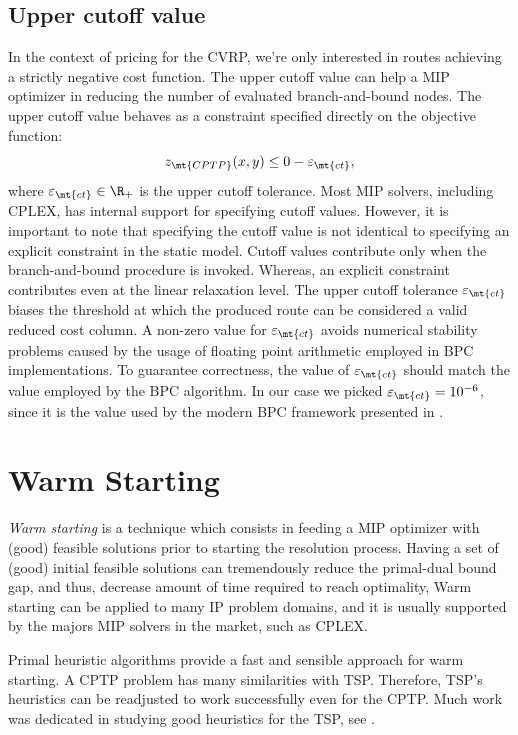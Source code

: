 \subsection{Upper cutoff value}
\label{sec:impl-upper-cutoff-value}

In the context of pricing for the CVRP,
we're only interested in routes achieving a strictly negative cost function.
The upper cutoff value can help a MIP optimizer
in reducing the number of evaluated branch-and-bound nodes.
The upper cutoff value behaves as a constraint specified directly on the objective function:
\begin{equation}
	z_\mt{CPTP}(x, y) \le 0 - \varepsilon_{\mt{ct}},
\end{equation}
where $\varepsilon_{\mt{ct}} \in \R_+$ is the upper cutoff tolerance.
Most MIP solvers, including CPLEX, has internal support for specifying cutoff values.
However, it is important to note that specifying the cutoff value is not identical
to specifying an explicit constraint in the static model.
Cutoff values contribute only when the branch-and-bound procedure is invoked.
Whereas, an explicit constraint contributes even at the linear relaxation level.
The upper cutoff tolerance $\varepsilon_{\mt{ct}}$ biases the threshold at which the produced
route can be considered a valid reduced cost column.
A non-zero value for $\varepsilon_{\mt{ct}}$ avoids numerical
stability problems caused by the usage of floating point arithmetic
employed in BPC implementations.
To guarantee correctness, the value of $\varepsilon_{\mt{ct}}$ should match the
value employed by the BPC algorithm.
In our case we picked $\varepsilon_{\mt{ct}} = 10^{-6}$,
since it is the value used by the modern BPC framework presented in \textcite{sadykov2021}.

\section{Warm Starting}
\label{sec:impl-warm-starting}

\textit{Warm starting} is a technique which consists in feeding
a MIP optimizer with (good) feasible solutions
prior to starting the resolution process.
Having a set of (good) initial feasible solutions
can tremendously reduce the primal-dual bound gap,
and thus,
decrease amount of time required to reach optimality,
Warm starting can be applied to many IP problem domains,
and it is usually supported by the majors MIP solvers in the market,
such as CPLEX.

Primal heuristic algorithms provide a fast and sensible approach for warm starting.
A CPTP problem has many similarities with TSP.
Therefore,
TSP's heuristics can be readjusted to work successfully even for the CPTP.
Much work was dedicated in studying good heuristics for the TSP,
see \cite{rosenkrantz1977, johnson1997, laporte1992, johnson2007, hoffman2013}.

